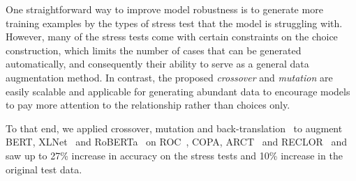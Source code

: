 

One straightforward way to improve model robustness is to generate more 
training examples by the types of stress test that the model is struggling with. 
However, many of the stress tests come with certain constraints on the choice
construction, which limits the number of cases that can be generated
automatically, and consequently their ability to serve as a general 
data augmentation method. In contrast, the proposed \textit{crossover} and \textit{mutation} are easily scalable and applicable for generating abundant data to encourage models to 
pay more attention to the relationship rather than choices only. 
 
To that end, we applied crossover, mutation and back-translation~\cite{back2019} 
to augment BERT, XLNet~\cite{xlnet2019nips} and RoBERTa~\cite{roberta2019} on ROC~\cite{roc2017}, COPA, ARCT~\cite{arct2018} and RECLOR~\cite{yu2020reclor} and saw
up to 27\% increase in accuracy on the stress tests and 10\% increase in
the original test data.

